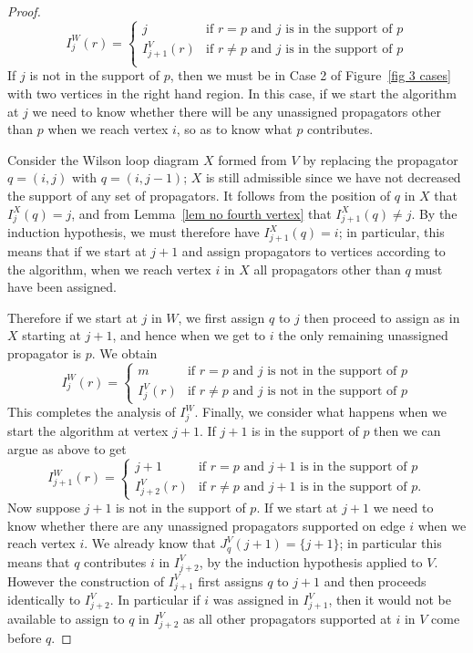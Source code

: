 \documentclass[11pt]{article}
\theoremstyle{remark}
\theoremstyle{definition}
\begin{document}
\begin{proof}
     \[
       I_j^{W}(r) = \begin{cases}
         j & \text{if $r=p$ and $j$ is in the support of $p$}\\
         I_{j+1}^{V}(r) & \text{if $r\neq p$ and $j$ is in the support of $p$}\\
       \end{cases}
       \]
If $j$ is not in the support of $p$, then we must be in Case 2 of Figure~\ref{fig 3 cases} with two vertices in the right hand region.  In this case, if we start the algorithm at $j$ we need to know whether there will be any unassigned propagators other than $p$ when we reach vertex $i$, so as to know what $p$ contributes.

Consider the Wilson loop diagram $X$ formed from $V$ by replacing the propagator $q = (i,j)$ with $q = (i, j-1)$;  $X$ is still admissible since we have not decreased the support of any set of propagators. 
It follows from the position of $q$ in $X$ that $I_j^X(q) = j$, and from Lemma~\ref{lem no fourth vertex} that $I_{j+1}^X(q) \neq j$. By the induction hypothesis, we must therefore have $I_{j+1}^X(q) = i$; in particular, this means that if we start at $j+1$ and assign propagators to vertices according to the algorithm, when we reach vertex $i$ in $X$ all propagators other than $q$ must have been assigned.

Therefore if we start at $j$ in $W$, we first assign $q$ to $j$ then proceed to assign as in $X$ starting at $j+1$, and hence when we get to $i$ the only remaining unassigned propagator is $p$. We obtain
       \[
       I_j^{W}(r) = \begin{cases}

       m & \text{if $r =p$ and $j$ is not in the support of $p$} \\
       I_{j}^{V}(r) & \text{if $r\neq p$ and $j$ is not in the support of $p$}\end{cases}
       \] 
This completes the analysis of $I_j^W$. Finally, we consider what happens when we start the algorithm at vertex $j+1$. If $j+1$ is in the support of $p$ then we can argue as above to get
\[
       I_{j+1}^{W}(r)  = \begin{cases}
         j+1 & \text{if $r=p$ and $j+1$ is in the support of $p$}\\
         I_{j+2}^{V}(r) & \text{if $r\neq p$ and $j+1$ is in the support of $p$}.
       \end{cases}
       \]
Now suppose $j+1$ is not in the support of $p$. If we start at $j+1$ we need to know whether there are any unassigned propagators supported on edge $i$ when we reach vertex $i$. We already know that $J_q^{V}(j+1) = \{j+1\}$; in particular this means that $q$ contributes $i$ in $I_{j+2}^{V}$, by the induction hypothesis applied to $V$. However the construction of $I^{V}_{j+1}$ first assigns $q$ to $j+1$ and then proceeds identically to $I^{V}_{j+2}$.  In particular if $i$ was assigned in $I^{V}_{j+1}$, then it would not be available to assign to $q$ in $I^{V}_{j+2}$ as all other propagators supported at $i$ in $V$ come before $q$. 


\end{proof}
\end{document}
